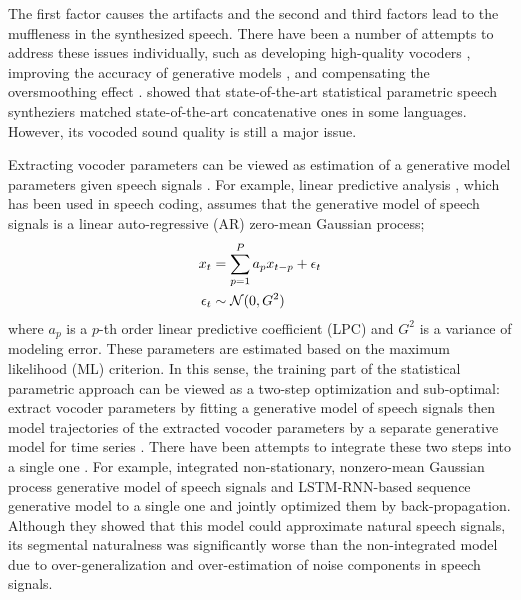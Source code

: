 The first factor causes the artifacts and the second and third factors lead to the muffleness in the synthesized speech.
There have been a number of attempts to address these issues individually, such as developing high-quality vocoders \citep{Kawahara_STRAIGHT,Vocaine,WORLD}, improving the accuracy of generative models \citep{Zen_trjHMM_CSL,Zen_DNN_ICASSP,Fan_BLSTM_Interspeech14,Uria_TrajectoryRNADE_ICASSP2015}, and compensating the oversmoothing effect \citep{Toda_MLGV_IEICE,Takamichi_ModulationSpectrum_TASLP}.
\cite{Zen_LSTMprod_Interspeech} showed that state-of-the-art statistical parametric speech syntheziers matched state-of-the-art concatenative ones in some languages.
However, its vocoded sound quality is still a major issue.

Extracting vocoder parameters can be viewed as estimation of a generative model parameters given speech signals \citep{LPC,UELS}.
For example, linear predictive analysis \citep{LPC}, which has been used in speech coding, assumes that the generative model of speech signals is 
a linear auto-regressive (AR) zero-mean Gaussian process;
\begin{align}
  x_t &= \sum_{p=1}^P a_p x_{t-p} + \epsilon_t \\
  \epsilon_t &\sim \mathcal{N}(0, G^2)
\end{align}
where $a_p$ is a $p$-th order linear predictive coefficient (LPC) and $G^2$ 
is a variance of modeling error.
These parameters are estimated based on the maximum likelihood (ML) criterion.
In this sense, the training part of the statistical parametric approach can be viewed as a two-step optimization and sub-optimal: extract vocoder parameters by fitting a generative model of speech signals then model trajectories of the extracted vocoder parameters by a separate generative model for time series \citep{Tokuda_ASRU2011}.
There have been attempts to integrate these two steps into a single one
\citep{STAVOCO,MGELSD,Maia_WaveformModel_SSW,Kazuhiro_McepHMM_IEICE,Black_AutoEncoder_arXiv,Tokuda_CepLSTM_ICASSP2015,Tokuda_MixCepLSTM_ICASSP2016,Takaki_FFTDNN_ICASSP}.
For example, \cite{Tokuda_MixCepLSTM_ICASSP2016} integrated non-stationary, nonzero-mean Gaussian process generative model of speech signals and LSTM-RNN-based sequence generative model to a single one and jointly optimized them by back-propagation.
Although they showed that this model could approximate natural speech signals, its segmental naturalness was significantly worse than the non-integrated model due to over-generalization and over-estimation of noise components in speech signals.

